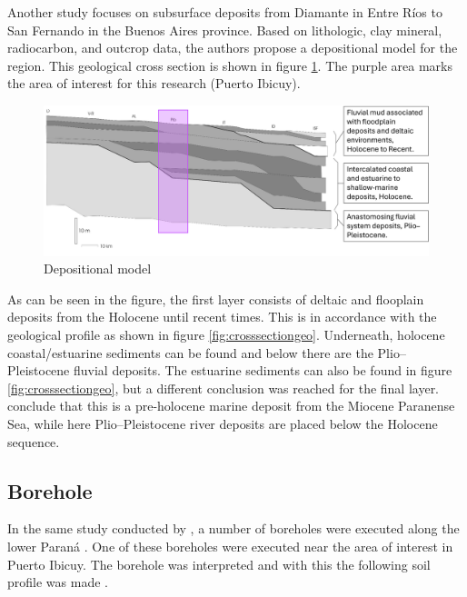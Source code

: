 Another study focuses on subsurface deposits from Diamante in Entre Ríos to San Fernando in the Buenos Aires province. Based on lithologic, clay mineral, radiocarbon, and outcrop data, the authors propose a depositional model for the region. This geological cross section is shown in figure \ref{fig:depmodel}. The purple area marks the area of interest for this research (Puerto Ibicuy).

\begin{figure}[H]
    \centering
    \includegraphics[width=1\linewidth]{figures/ch9/Crosssection2.png}
    \caption{Depositional model \autocite{amatoESTRATIGRAFIACUATERNARIASUBSUELO2009}}
    \label{fig:depmodel}
\end{figure}

As can be seen in the figure, the first layer consists of deltaic and flooplain deposits from the Holocene until recent times. This is in accordance with the geological profile as shown in figure \ref{fig:crosssectiongeo}. Underneath, holocene coastal/estuarine sediments can be found and below there are the Plio–Pleistocene fluvial deposits. The estuarine sediments can also be found in figure \ref{fig:crosssectiongeo}, but a different conclusion was reached for the final layer. \citeauthor{joseluiscavallottoEvolucionCambiosAmbientales2005} conclude that this is a pre-holocene marine deposit from the Miocene Paranense Sea, while here Plio–Pleistocene river deposits are placed below the Holocene sequence.

\subsection{Borehole}
In the same study conducted by \citeauthor{amatoESTRATIGRAFIACUATERNARIASUBSUELO2009}, a number of boreholes were executed along the lower Paraná \autocite{amatoESTRATIGRAFIACUATERNARIASUBSUELO2009}. One of these boreholes were executed near the area of interest in Puerto Ibicuy. The borehole was interpreted and with this the following soil profile was made  \autocite{amatoESTRATIGRAFIACUATERNARIASUBSUELO2009}.

